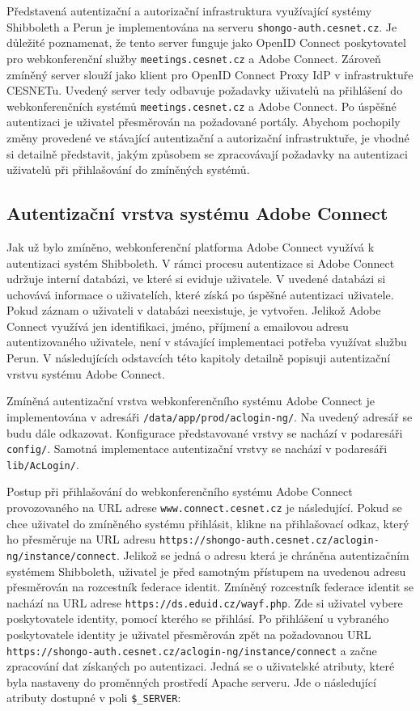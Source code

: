 \documentclass[
  printed, %
  twoside, %
  table,   %
  nolof,     %
  nolot,     %
]{fithesis3}
\begin{document}
Představená autentizační a autorizační infrastruktura využívající systémy Shibboleth a Perun je implementována na serveru \texttt{shongo-auth.cesnet.cz}. Je důležité poznamenat, že tento server funguje jako OpenID Connect poskytovatel pro webkonferenční služby \texttt{meetings.cesnet.cz} a Adobe Connect. Zároveň zmíněný server slouží jako klient pro OpenID Connect Proxy IdP v infrastruktuře CESNETu. Uvedený server tedy odbavuje požadavky uživatelů na přihlášení do webkonferenčních systémů \texttt{meetings.cesnet.cz} a Adobe Connect. Po úspěšné autentizaci je uživatel přesměrován na požadované portály. Abychom pochopily změny provedené ve stávající autentizační a autorizační infrastruktuře, je vhodné si detailně představit, jakým způsobem se zpracovávají požadavky na autentizaci uživatelů při přihlašování do zmíněných systémů.  

\subsection{Autentizační vrstva systému Adobe Connect}
\label{ac-old}
Jak už bylo zmíněno, webkonferenční platforma Adobe Connect využívá k autentizaci systém Shibboleth. V rámci procesu autentizace si Adobe Connect udržuje interní databázi, ve které si eviduje uživatele. V
uvedené databázi si uchovává informace o uživatelích,
které získá po úspěšné autentizaci uživatele. Pokud záznam o uživateli
v databázi neexistuje, je vytvořen. Jelikož Adobe Connect využívá jen
identifikaci, jméno, příjmení a emailovou adresu autentizovaného uživatele, není v stávající implementaci
potřeba využívat službu Perun. V následujících odstavcích této kapitoly detailně popisuji autentizační vrstvu systému Adobe Connect. \par

Zmíněná autentizační vrstva webkonferenčního systému Adobe Connect je implementována v adresáři \texttt{/data/app/prod/aclogin-ng/}. Na uvedený adresář se budu dále odkazovat. Konfigurace představované vrstvy se nachází v podaresáři \texttt{config/}. Samotná implementace autentizační vrstvy se nachází v podaresáři \texttt{lib/AcLogin/}. \par

Postup při přihlašování do webkonferenčního systému Adobe Connect provozovaného na URL adrese \texttt{www.connect.cesnet.cz} je následující. Pokud se chce uživatel do zmíněného systému přihlásit, klikne na přihlašovací odkaz, který ho přesměruje na URL adresu \texttt{https://shongo-auth.cesnet.cz/aclogin-ng/instance/connect}. Jelikož se jedná o adresu která je chráněna autentizačním systémem Shibboleth, uživatel je před samotným přístupem na uvedenou adresu přesměrován na rozcestník federace identit. Zmíněný rozcestník federace identit se nachází na URL adrese \texttt{https://ds.eduid.cz/wayf.php}. Zde si uživatel vybere poskytovatele identity, pomocí kterého se přihlásí. Po přihlášení u vybraného poskytovatele identity je uživatel  přesměrován zpět na požadovanou URL \texttt{https://shongo-auth.cesnet.cz/aclogin-ng/instance/connect} a začne zpracování dat získaných po autentizaci. Jedná se o uživatelské atributy, které byla nastaveny do proměnných prostředí Apache serveru. Jde o následující atributy dostupné v poli \texttt{\$\_SERVER}: 
\end{document}
